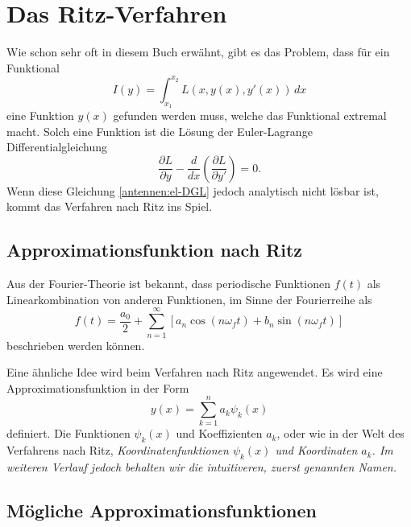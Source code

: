 %
%
% 
%
%

\section{Das Ritz-Verfahren\label{antennen:ritzGrundsätzlich}}

Wie schon sehr oft in diesem Buch erwähnt, gibt es das Problem, dass für ein Funktional
\begin{equation}
I(y)
=
\int_{x_1}^{x_2}L(x,y(x),y'(x))\,dx
\label{antennen:normalesFunktional}
\end{equation}
eine Funktion $y(x)$ gefunden werden muss, welche das Funktional extremal macht.
Solch eine Funktion ist die Lösung der Euler-Lagrange Differentialgleichung
\begin{equation}
\frac{\partial L}{\partial y} - \frac{d}{dx} \left( \frac{\partial L}{\partial y'} \right) = 0.
\label{antennen:el-DGL}
\end{equation}
Wenn diese Gleichung \eqref{antennen:el-DGL} 
jedoch analytisch nicht lösbar ist, kommt das Verfahren nach Ritz ins Spiel.

\subsection{Approximationsfunktion nach Ritz\label{antennen:approxFunkt}}

Aus der Fourier-Theorie ist bekannt, dass
periodische Funktionen $f(t)$ als Linearkombination von anderen Funktionen, 
im Sinne der Fourierreihe als
\begin{equation}
f(t)
=
\frac{a_0}{2}+\sum_{n=1}^{\infty}[a_n\cos(n \omega_f t )+b_n\sin(n \omega_f t)]
\label{antennen:fourier}
\end{equation}
beschrieben werden können.

Eine ähnliche Idee wird beim Verfahren nach Ritz angewendet.
Es wird eine Approximationsfunktion in der Form
\begin{equation}
y(x)=\sum_{k=1}^n a_k \psi_k(x)
\label{antennen:ritzFunkt}
\end{equation}
definiert. Die Funktionen $\psi_k(x)$ und Koeffizienten $a_k$, oder
wie in der Welt des Verfahrens nach Ritz,  
\em Koordinatenfunktionen $\psi_k(x)$ \em und \em Koordinaten \em $a_k$.
Im weiteren Verlauf jedoch behalten wir die intuitiveren, zuerst genannten Namen.

\subsection{Mögliche Approximationsfunktionen\label{antennen:approxBsp}}

